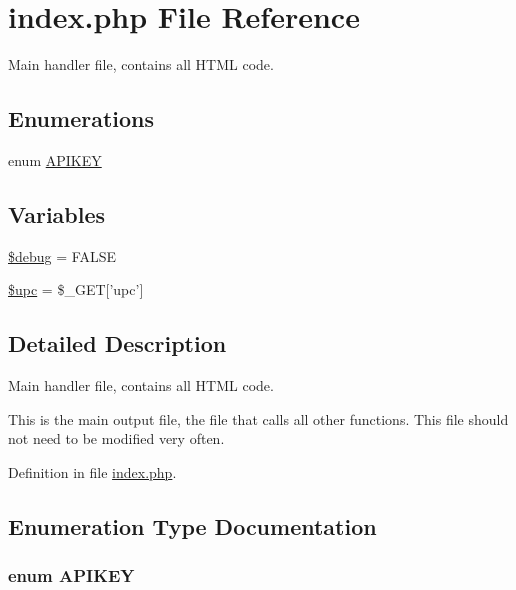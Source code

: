 \hypertarget{index_8php}{
\section{index.php File Reference}
\label{index_8php}
}
Main handler file, contains all HTML code. 

\subsection*{Enumerations}
\begin{CompactItemize}
\item 
enum \hyperlink{index_8php_cb68d0635f57ee9137fb7985a2357c5c}{APIKEY} 
\end{CompactItemize}
\subsection*{Variables}
\begin{CompactItemize}
\item 
\hyperlink{index_8php_85ae3e64cd40e9564adceb010085e9dd}{\$debug} = FALSE
\item 
\hyperlink{index_8php_a9aa17ff51d69075d75cfc5bc4e89b34}{\$upc} = \$\_\-GET\mbox{[}'upc'\mbox{]}
\end{CompactItemize}


\subsection{Detailed Description}
Main handler file, contains all HTML code. 

This is the main output file, the file that calls all other functions. This file should not need to be modified very often. 

Definition in file \hyperlink{index_8php-source}{index.php}.

\subsection{Enumeration Type Documentation}
\hypertarget{index_8php_cb68d0635f57ee9137fb7985a2357c5c}{
\subsubsection{\setlength{\rightskip}{0pt plus 5cm}enum {\bf APIKEY}}}
\label{index_8php_cb68d0635f57ee9137fb7985a2357c5c}


